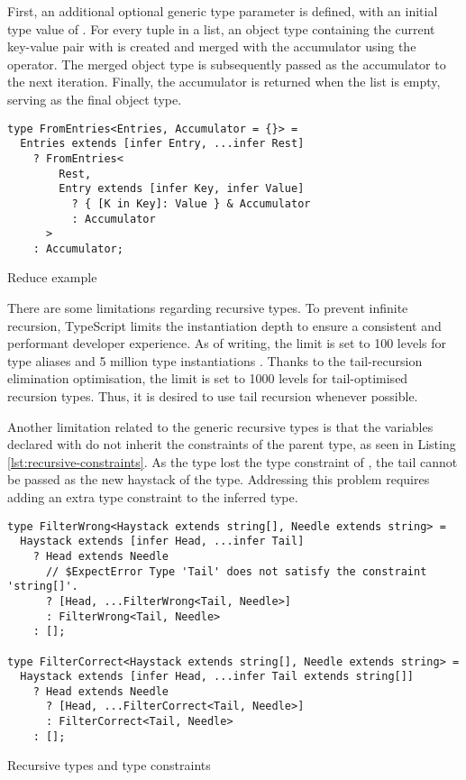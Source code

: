 First, an additional optional generic type parameter  is defined, with an initial type value of \code{{}}. For every tuple in a list, an object type containing the current key-value pair with  is created and merged with the accumulator using the \vcode{&} operator. The merged object type is subsequently passed as the accumulator to the next iteration. Finally, the accumulator is returned when the list is empty, serving as the final object type.

\begin{listing}[ht]
  \begin{verbatim}
type FromEntries<Entries, Accumulator = {}> =
  Entries extends [infer Entry, ...infer Rest]
    ? FromEntries<
        Rest,
        Entry extends [infer Key, infer Value]
          ? { [K in Key]: Value } & Accumulator
          : Accumulator
      >
    : Accumulator;
\end{verbatim}
  \caption{Reduce example}\label{lst:reduce-type}
\end{listing}

There are some limitations regarding recursive types. To prevent infinite recursion, TypeScript limits the instantiation depth to ensure a consistent and performant developer experience. As of writing, the limit is set to 100 levels for type aliases and 5 million type instantiations \cite{ImplementationCheckerTs2023}. Thanks to the tail-recursion elimination optimisation, the limit is set to 1000 levels for tail-optimised recursion types. Thus, it is desired to use tail recursion whenever possible.

Another limitation related to the generic recursive types is that the variables declared with  do not inherit the constraints of the parent type, as seen in Listing \ref{lst:recursive-constraints}. As the  type lost the type constraint of , the tail cannot be passed as the new haystack of the  type. Addressing this problem requires adding an extra type constraint to the inferred type.

\begin{listing}[ht]
  \begin{verbatim}
type FilterWrong<Haystack extends string[], Needle extends string> =
  Haystack extends [infer Head, ...infer Tail]
    ? Head extends Needle
      // $ExpectError Type 'Tail' does not satisfy the constraint 'string[]'.
      ? [Head, ...FilterWrong<Tail, Needle>]
      : FilterWrong<Tail, Needle>
    : [];

type FilterCorrect<Haystack extends string[], Needle extends string> =
  Haystack extends [infer Head, ...infer Tail extends string[]]
    ? Head extends Needle
      ? [Head, ...FilterCorrect<Tail, Needle>]
      : FilterCorrect<Tail, Needle>
    : [];
\end{verbatim}
  \caption{Recursive types and type constraints}\label{lst:recursive-constraints}
\end{listing}

